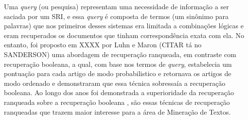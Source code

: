Uma \textit{query} (ou pesquisa) representam uma necessidade de informação a ser saciada por um SRI, e essa \textit{query} é composta de termos (um sinônimo para palavras) que nos primeiros desses sistemas era limitada a combinações lógicas e eram recuperados os documentos que tinham correspondência exata com ela. 
No entanto, foi proposto em XXXX por Luhn e Maron (CITAR tá no SANDERSON) uma abordagem de recuperação ranqueada, em contraste com recuperação booleana, a qual, com base nos termos de \textit{query}, estabelecia um pontuação para cada artigo de modo probabilistico e retornava os artigos de modo ordenado e demonstraram que essa técnica sobressaía a recuperação booleana. 
Ao longo dos anos foi demonstrada a superioridade da recuperação ranqueada sobre a recuperação booleana \cite{Jones:1981:IRE:539571}, são essas técnicas de recuperação ranqueadas que trazem maior interesse para a área de Mineração de Textos.



